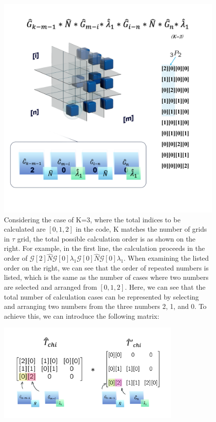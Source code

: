 \documentclass{article}
\begin{document}
\begin{spacing}{1.5}
\begin{figure}[p]
  \centerline{\includegraphics[width=12cm]{TexFigure/3_Tmat.png}}
  \caption{Considering the case of K=3, where the total indices to be calculated are $[0, 1, 2]$ in the code, K matches the number of grids in $\tau$ grid, the total possible calculation order is as shown on the right. 
  For example, in the first line, the calculation proceeds in the order of $\mathcal{G}[2]\hat{N}\mathcal{G}[0]\lambda_1\mathcal{G}[0]\hat{N}\mathcal{G}[0]\lambda_1$. 
  When examining the listed order on the right, we can see that the order of repeated numbers is listed, 
  which is the same as the number of cases where two numbers are selected and arranged from $[0, 1, 2]$.
  Here, we can see that the total number of calculation cases can be represented by selecting and arranging two numbers from the three numbers 2, 1, and 0. To achieve this, we can introduce the following matrix:
}
\end{figure}
\pagebreak
\begin{figure}[H]
  \centerline{\includegraphics[width=9cm]{TexFigure/Tmat2.png}}

\end{figure}
\end{spacing}
\end{document}
